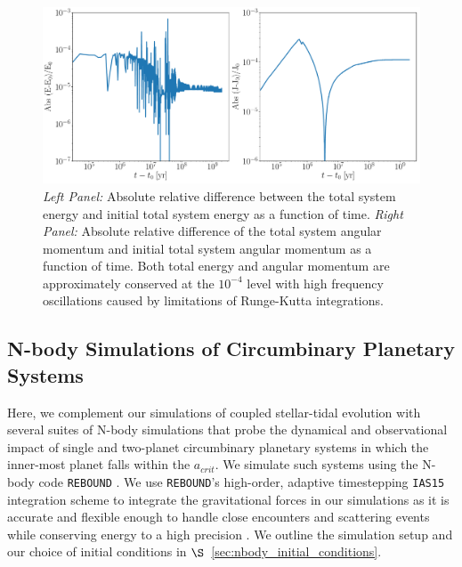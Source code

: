\begin{figure}[t]
	\includegraphics[width=\textwidth]{conservation.pdf}
    \caption{{\it Left Panel:} Absolute relative difference between the total system energy and initial total system energy as a function of time.  {\it Right Panel:} Absolute relative difference of the total system angular momentum and initial total system angular momentum as a function of time.  Both total energy and angular momentum are approximately conserved at the $10^{-4}$ level with high frequency oscillations caused by limitations of Runge-Kutta integrations.}
    \label{fig:conservation}
\end{figure}


\subsection{N-body Simulations of Circumbinary Planetary Systems} \label{sec:nbody_methods}

Here, we complement our \vplanet simulations of coupled stellar-tidal evolution with several suites of N-body simulations that probe the dynamical and observational impact of single and two-planet circumbinary planetary systems in which the inner-most planet falls within the $a_{crit}$.  We simulate such systems using the N-body code \texttt{REBOUND} \citep{Rein2012}.  We use \texttt{REBOUND}'s high-order, adaptive timestepping \texttt{IAS15} integration scheme to integrate the gravitational forces in our simulations as it is accurate and flexible enough to handle close encounters and scattering events while conserving energy to a high precision \citep{Rein2015}.  We outline the simulation setup and our choice of initial conditions in $\S$~\ref{sec:nbody_initial_conditions}.


